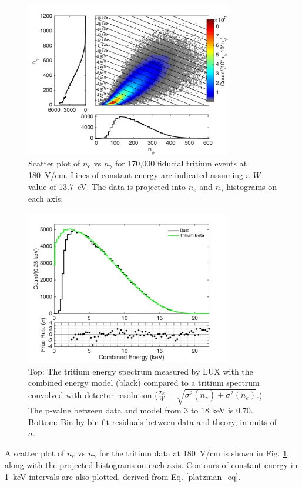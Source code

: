 \begin{figure}[h!]
\includegraphics[width=90mm]{fig/tritium_scatter.png}
\caption{Scatter plot of $n_e$ vs $n_{\gamma}$ for 170,000 fiducial tritium events at 180~V/cm. Lines of constant energy are indicated assuming a $W$-value of 13.7~eV. The data is projected into $n_e$ and $n_{\gamma}$ histograms on each axis.}
\label{fig:tritium-scatter}
\end{figure}


\begin{figure}[h!]
\begin{center}
\includegraphics[width=90mm]{fig/tritium-spectrum-linear.png}
\caption{Top: The tritium energy spectrum measured by LUX with the combined energy model (black) compared to  a tritium spectrum convolved with detector resolution  ($\frac{\sigma_E}{W} = \sqrt{\sigma^2(n_{\gamma})+ \sigma^2(n_e)}$.) The p-value between data and model from 3 to 18 keV is 0.70. Bottom: Bin-by-bin fit residuals between data and theory, in units of $\sigma$. }
\label{fig:tritium-spectrum}
\end{center}
\end{figure}


A scatter plot of $n_e$ vs $n_{\gamma}$ for the tritium data at 180~V/cm is shown in Fig. \ref{fig:tritium-scatter}, along with the projected histograms on each axis. Contours of constant energy in 1~keV intervals are also plotted, derived from Eq. \ref{platzman_eq}. 

